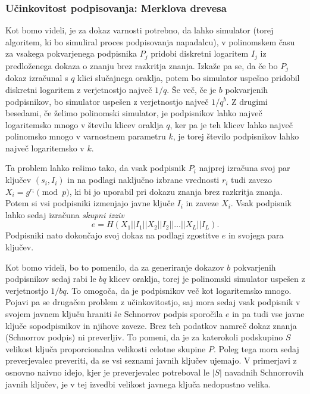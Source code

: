 \documentclass[isrm2, tisk]{fmfdelo}
\begin{document}
\subsubsection{Učinkovitost podpisovanja: Merklova drevesa}
Kot bomo videli, je za dokaz varnosti potrebno, da lahko simulator (torej algoritem, ki bo simuliral
proces podpisovanja napadalcu), v polinomskem času za vsakega pokvarjenega podpisnika $P_j$ pridobi
diskretni logaritem $I_j$ iz predloženega dokaza o znanju brez razkritja znanja. Izkaže pa se, da če
bo $P_j$ dokaz izračunal s $q$ klici slučajnega oraklja, potem bo simulator uspešno pridobil diskretni
logaritem z verjetnostjo največ $1/q$. Še več, če je $b$ pokvarjenih podpisnikov, bo simulator
uspešen z verjetnostjo največ $1/q^b$. Z drugimi besedami, če želimo polinomski simulator, je
podpisnikov lahko največ logaritemsko mnogo v številu klicev oraklja $q$, ker pa je teh klicev
lahko največ polinomsko mnogo v varnostnem parametru $k$, je torej število podpisnikov lahko
največ logaritemsko v $k$.

Ta problem lahko rešimo tako, da vsak podpisnik $P_i$ najprej izračuna svoj par ključev $(s_i, I_i)$
in na podlagi naključno izbrane vrednosti $r_i$ tudi zavezo $X_i = g^{r_i} \pmod p$, ki bi jo uporabil
pri dokazu znanja brez razkritja znanja. Potem si vsi podpisniki izmenjajo javne ključe $I_i$ in
zaveze $X_i$. Vsak podpisnik lahko sedaj izračuna \textit{skupni izziv}
$$
e = H(X_1 || I_1 || X_2 || I_2 || \dots || X_L || I_L).
$$
Podpisniki nato dokončajo svoj dokaz na podlagi zgostitve $e$ in svojega para ključev.

Kot bomo videli, bo to pomenilo, da za generiranje dokazov $b$ pokvarjenih podpisnikov sedaj rabi le
$bq$ klicev oraklja, torej je polinomski simulator uspešen z verjetnostjo $1/bq$. To omogoča, da je
podpisnikov več kot logaritemsko mnogo. Pojavi pa se drugačen problem z učinkovitostjo, saj mora
sedaj vsak podpisnik v svojem javnem ključu hraniti še Schnorrov podpis sporočila $e$ in pa tudi vse
javne ključe sopodpisnikov in njihove zaveze. Brez teh podatkov namreč dokaz znanja (Schnorrov podpis)
ni preverljiv. To pomeni, da je za katerokoli podskupino $S$ velikost ključa proporcionalna velikosti
celotne skupine $P$. Poleg tega mora sedaj preverjevalec preveriti, da se vsi seznami javnih ključev
ujemajo. V primerjavi z osnovno naivno idejo, kjer je preverjevalec potreboval le $|S|$ navadnih
Schnorrovih javnih ključev, je v tej izvedbi velikost javnega ključa nedopustno velika.
\end{document}
